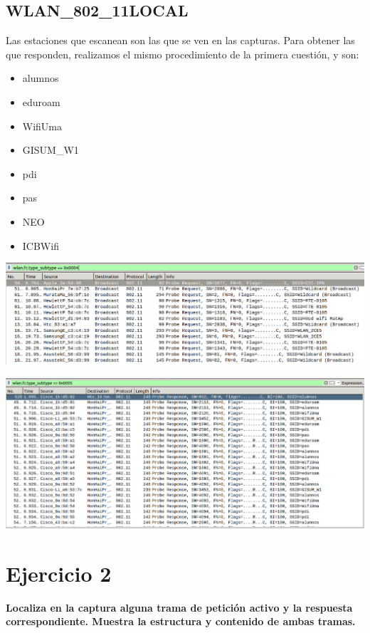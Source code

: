 \documentclass{article}
\begin{document}
\subsection{WLAN\_802\_11LOCAL}

Las estaciones que escanean son las que se ven en las capturas. Para obtener las que responden, realizamos el mismo procedimiento de la primera cuestión, y son:

\begin{itemize}
\item alumnos
\item eduroam
\item WifiUma
\item GISUM\_W1
\item pdi
\item pas
\item NEO
\item ICB\-Wifi
\end{itemize}

\begin{center}
\includegraphics[scale=0.3]{WLAN/probreqlocal.png}
\end{center}
\begin{center}
\includegraphics[scale=0.3]{WLAN/probreslocal.png}
\end{center}


\section{Ejercicio 2}

\textbf{Localiza en la captura alguna trama de petición activo y la respuesta
correspondiente. Muestra la estructura y contenido de ambas tramas.}
\end{document}
